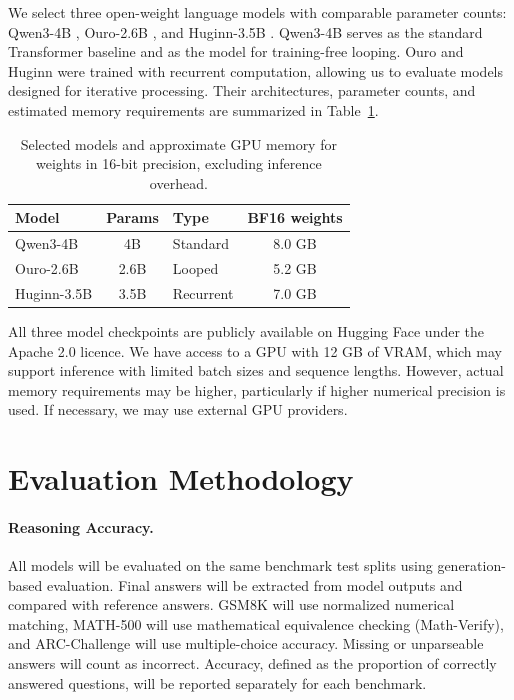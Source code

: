 \documentclass[11pt]{article}
\begin{document}
We select three open-weight language models with
comparable parameter counts: Qwen3-4B
\cite{qwen2025qwen3}, Ouro-2.6B
\cite{zhu2026scaling}, and Huginn-3.5B
\cite{geiping2025scaling}. Qwen3-4B serves as
the standard Transformer baseline and as the model
for training-free looping. Ouro and Huginn were
trained with recurrent computation, allowing us
to evaluate models designed for iterative processing. Their architectures, parameter counts, and estimated memory requirements are summarized in Table~\ref{tab:models}.

\begin{table}[t]
\centering
\small
\setlength{\tabcolsep}{4pt}
\begin{tabular}{@{}lclc@{}}
\toprule
Model & Params & Type & BF16 weights \\
\midrule
Qwen3-4B & 4B & Standard & 8.0 GB \\
Ouro-2.6B & 2.6B & Looped & 5.2 GB \\
Huginn-3.5B & 3.5B & Recurrent & 7.0 GB \\
\bottomrule
\end{tabular}
\caption{Selected models and approximate GPU
memory for weights in 16-bit precision,
excluding inference overhead.}
\label{tab:models}
\end{table}

All three model checkpoints are publicly available
on Hugging Face under the Apache 2.0 licence.
We have access to a GPU with 12 GB of VRAM,
which may support inference with limited batch
sizes and sequence lengths. However, actual memory requirements may be higher,
particularly if higher numerical precision is used.
If necessary, we may use external GPU providers.

\section{Evaluation Methodology}
\label{sec:evaluation}

\paragraph{Reasoning Accuracy.}
All models will be evaluated on the same benchmark test
splits using generation-based evaluation. Final answers
will be extracted from model outputs and compared with
reference answers. GSM8K will use normalized numerical
matching, MATH-500 will use mathematical equivalence
checking (Math-Verify), and ARC-Challenge will use
multiple-choice accuracy. Missing or unparseable answers
will count as incorrect. Accuracy, defined as the
proportion of correctly answered questions, will be
reported separately for each benchmark.
\end{document}
